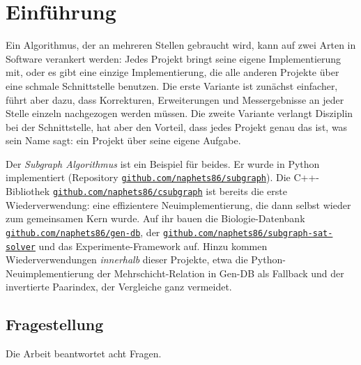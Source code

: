 \documentclass[a4paper,12pt,twoside]{report}
\DeclareRobustCommand{\_}{\textunderscore\allowbreak{}}
\theoremstyle{definition}
\newcommand{\repo}[1]{\href{https://github.com/naphets86/#1}{\nolinkurl{github.com/naphets86/#1}}}
\begin{document}
\chapter{Einführung}
\label{chap:einleitung}
 
Ein Algorithmus, der an mehreren Stellen gebraucht wird, kann auf zwei Arten in Software verankert werden: Jedes Projekt bringt seine eigene Implementierung mit, oder es gibt eine einzige Implementierung, die alle anderen Projekte über eine schmale Schnittstelle benutzen. Die erste Variante ist zunächst einfacher, führt aber dazu, dass Korrekturen, Erweiterungen und Messergebnisse an jeder Stelle einzeln nachgezogen werden müssen. Die zweite Variante verlangt Disziplin bei der Schnittstelle, hat aber den Vorteil, dass jedes Projekt genau das ist, was sein Name sagt: ein Projekt über seine eigene Aufgabe.
 
Der \emph{Subgraph Algorithmus} \cite{epp2026subgraph} ist ein Beispiel für beides. Er wurde in Python implementiert (Repository \repo{subgraph}). Die C++-Bibliothek \repo{csubgraph} ist bereits die erste Wiederverwendung: eine effizientere Neuimplementierung, die dann selbst wieder zum gemeinsamen Kern wurde. Auf ihr bauen die Biologie-Datenbank \repo{gen-db}, der \repo{subgraph-sat-solver} und das Experimente-Framework auf. Hinzu kommen Wiederverwendungen \emph{innerhalb} dieser Projekte, etwa die Python-Neuimplementierung der Mehrschicht-Relation in Gen-DB als Fallback und der invertierte Paarindex, der Vergleiche ganz vermeidet.
 
\section{Fragestellung}
 
Die Arbeit beantwortet acht Fragen.
 
\end{document}
